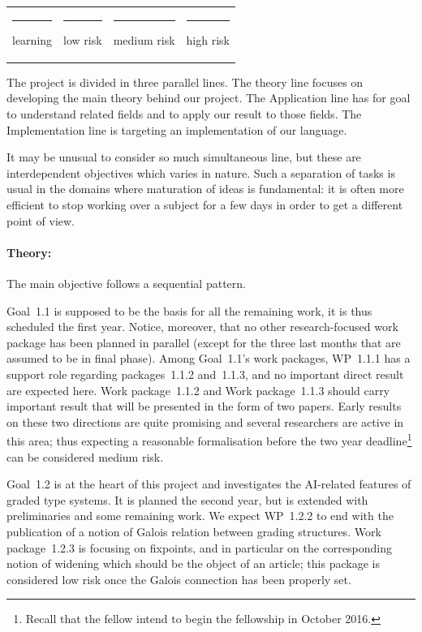 \documentclass{article}[11pt]
\begin{document}
\begin{tabular}{c c c c}
{\color{cyan!20}\rule{13pt}{13pt}}  learning &
{\color{green!20}\rule{13pt}{13pt}}  low risk &
{\color{yellow!30}\rule{13pt}{13pt}}  medium risk &
{\color{red!20}\rule{13pt}{13pt}}  high risk
\end{tabular}

\medskip

The project is divided in three parallel lines. The theory line focuses on developing the main theory behind our project. The Application line has for goal to understand related fields and to apply our result to those fields. The Implementation line is targeting an implementation of our language.

It may be unusual to consider so much simultaneous line, but these are interdependent objectives which varies in nature. Such a separation of tasks is usual in the domains where maturation of ideas is fundamental: it is often more efficient to stop working over a subject for a few days in order to get a different point of view.

\paragraph{Theory:}
The main objective follows a sequential pattern.

Goal~1.1 is supposed to be the basis for all the remaining work, it is thus scheduled the first year. Notice, moreover, that no other research-focused work package has been planned in parallel (except for the three last months that are assumed to be in final phase). %
Among Goal~1.1's work packages, WP~1.1.1 has a support role regarding packages~1.1.2 and~1.1.3, and no important direct result are expected here. Work package~1.1.2 and Work package~1.1.3 should carry important result that will be presented in the form of two papers. Early results on these two directions are quite promising and several researchers are active in this area; thus expecting a reasonable formalisation before the two year deadline\footnote{Recall that the fellow intend to begin the fellowship in October 2016.} can be considered medium risk. 

Goal~1.2 is at the heart of this project and investigates the AI-related features of graded type systems. It is planned the second year, but is extended with preliminaries and some remaining work. We expect WP~1.2.2 to end with the publication of a notion of Galois relation between grading structures. Work package~1.2.3 is focusing on fixpoints, and in particular on the corresponding notion of widening which should be the object of an article; this package is considered low risk once the Galois connection has been properly set.
\end{document}
